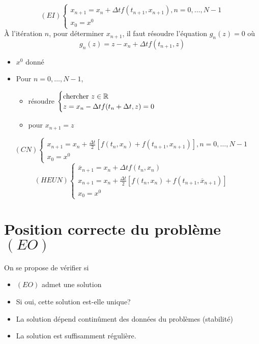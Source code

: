 \[
    (EI) \begin{cases}
        x_{n+1} = x_n + \Delta t f(t_{n+1}, x_{n+1}), n=0, \ldots, N-1\\
        x_0 = x^0
    \end{cases}
\] 
À l'itération $n$, pour déterminer  $x_{n+1}$, il faut résoudre l'équation $g_n(z) = 0$ où 
 \[
    g_n(z) = z - x_n + \Delta t f(t_{n+1}, z)
\] 
\begin{itemize}
    \item 
        $x^0$ donné
    \item 
        Pour $n = 0, \ldots, N-1$,
        \begin{itemize}
            \item résoudre $\begin{cases}
                \text{chercher } z \in \mathbb{R}\\
                z = x_n - \Delta t f(t_n + \Delta t, z) = 0
            \end{cases}$
            \item pour $x_{n+1} = z$
        \end{itemize}
\end{itemize}

\[
    (CN) \begin{cases}
        x_{n+1} = x_n + \frac{\Delta t}{2}\left[ f(t_n, x_n) + f(t_{n+1}, x_{n+1}) \right], n= 0, \ldots, N-1 \\
        x_0 = x^0
    \end{cases}
\] 
\[
    (HEUN)\begin{cases}
       \overline{x}_{n+1} = x_n + \Delta t f(t_n, x_n)\\ 
       x_{n+1} = x_n + \frac{\Delta t}{2} \left[ f(t_n, x_n) + f(t_{n+1}, \overline{x}_{n+1}) \right] \\
       x_0 = x^0
    \end{cases}
\] 

\section{Position correcte du problème $(EO)$}
On se propose de vérifier si
\begin{itemize}
    \item $(EO)$ admet une solution
    \item Si oui, cette solution est-elle unique?
    \item La solution dépend continûment des données du problèmes (stabilité)
    \item La solution est suffisamment régulière.
\end{itemize}


